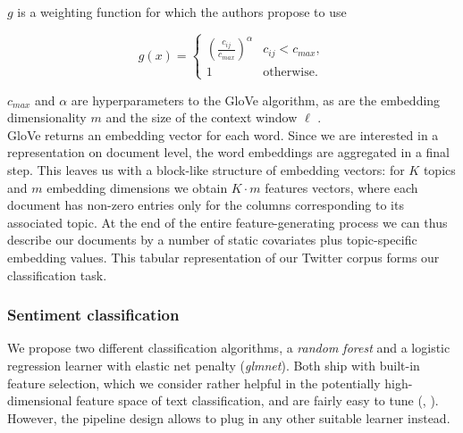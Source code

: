 $g$ is a weighting function for which the authors propose to use

\begin{equation*}
  g(x) = \begin{cases} \left( \frac{c_{ij}}{c_{\mathit{max}}} \right)^{\alpha} & 
  c_{ij} < c_{\mathit{max}}, \\
  1 & \text{otherwise}.
  \end{cases}
\end{equation*}

$c_{\mathit{max}}$ and $\alpha$ are hyperparameters to the GloVe algorithm, as 
are the embedding dimensionality $m$ and the size of the context window $\ell$ 
\citep{penningtonetal2014}.
\\

GloVe returns an embedding vector for each word.
Since we are interested in a representation on document level, the word 
embeddings are aggregated in a final step.
This leaves us with a block-like structure of embedding vectors: for $K$ topics 
and $m$ embedding dimensions we obtain $K \cdot m$ features vectors, where each 
document has non-zero entries only for the columns corresponding to its 
associated topic.
At the end of the entire feature-generating process we can thus describe our 
documents by a number of static covariates plus topic-specific embedding values.
This tabular representation of our Twitter corpus forms our classification task.


\subsubsection{Sentiment classification}
\label{classifiers}

We propose two different classification algorithms, a \textit{random forest} and 
a logistic regression learner with elastic net penalty (\textit{glmnet}).
Both ship with built-in feature selection, which we consider rather helpful in 
the potentially high-dimensional feature space of text classification, and are 
fairly easy to tune (\citet{japkowiczshah2011}, \citet{probstetal2019}).
However, the pipeline design allows to plug in any other suitable learner 
instead.
\\

